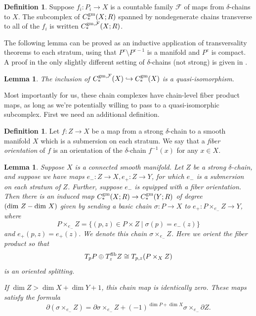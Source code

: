 \documentclass{memo-l}
\newtheorem{lemma}[theorem]{Lemma}
\theoremstyle{definition}
\newtheorem{definition}[theorem]{Definition}
\theoremstyle{remark}
\numberwithin{section}{chapter}
\numberwithin{equation}{chapter}
\begin{document}
\begin{definition}\label{trans-chains}Suppose $f_i: P_i \to X$ is a countable family $\mathcal F$ of maps from $\delta$-chains to $X$. The subcomplex of $C_*^{\textup{gm}}(X;R)$ spanned by nondegenerate chains transverse to all of the $f_i$ is written $C_*^{\textup{gm},\mathcal F}(X;R)$.
\end{definition}

The following lemma can be proved as an inductive application of transversality theorems to each stratum, using that $P^e \setminus P^{e-1}$ is a manifold and $P^e$ is compact. A proof in the only slightly different setting of $\delta$-chains (not strong) is given in \cite[Lemma~4.1.14]{Lin}. 

\begin{lemma}\label{qi-trans}The inclusion of $C_*^{\textup{gm},\mathcal F}(X) \hookrightarrow C_*^{\textup{gm}}(X)$ is a quasi-isomorphism.
\end{lemma}

Most importantly for us, these chain complexes have chain-level fiber product maps, as long as we're potentially willing to pass to a quasi-isomorphic subcomplex. First we need an additional definition.

\begin{definition}\label{FOrient}Let $f: Z \to X$ be a map from a strong $\delta$-chain to a smooth manifold $X$ which is a submersion on each stratum. We say that a \emph{fiber orientation} of $f$ is an orientation of the $\delta$-chain $f^{-1}(x)$ for any $x \in X$. 
\end{definition}

\begin{lemma}\label{fibprod}Suppose $X$ is a connected smooth manifold. Let $Z$ be a strong $\delta$-chain, and suppose we have maps $e_-: Z \to X, e_+: Z \to Y$, for which $e_-$ is a submersion on each stratum of $Z$. Further, suppose $e_-$ is equipped with a fiber orientation. Then there is an induced map $C^{\textup{gm}}_*(X;R) \to C^{\textup{gm}}_*(Y;R)$ of degree $(\textup{dim } Z - \textup{dim } X)$ given by sending a basic chain $\sigma: P \to X$ to $e_+: P \times_{e_-} Z\to Y$, where $$P \times_{e_-} Z = \{(p, z) \in P \times Z \mid \sigma(p) = e_-(z)\}$$ and $e_+(p,z) = e_+(z)$. We denote this chain $\sigma \times_{e_-} Z$. Here we orient the fiber product so that $$T_p P \oplus T^{\textup{fib}}_zZ \cong T_{p,z} (P \times_X Z)$$ is an oriented splitting.

If $\dim Z > \dim X + \dim Y + 1$, this chain map is identically zero. These maps satisfy the formula $$\partial(\sigma \times_{e_-} Z) =  \partial \sigma \times_{e_-} Z + (-1)^{\dim P + \dim X}\sigma \times_{e_-} \partial Z.$$
\end{lemma}
\end{document}
